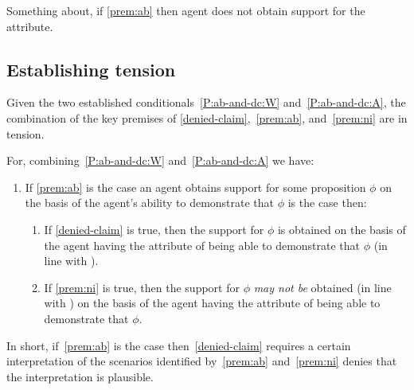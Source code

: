 \begin{note}
  Something about, if \ref{prem:ab} then agent does not obtain support for the attribute.
\end{note}

\subsection{Establishing tension}
\label{sec:establishing-tension}

\begin{note}[Summary]
  Given the two established conditionals~\ref{P:ab-and-dc:W} and~\ref{P:ab-and-dc:A}, the combination of the key premises of \ref{denied-claim},~\ref{prem:ab}, and~\ref{prem:ni} are in tension.

  For, combining~\ref{P:ab-and-dc:W} and~\ref{P:ab-and-dc:A} we have:
  \begin{enumerate}[label=(CC), ref=(CC)]
  \item If \ref{prem:ab} is the case an agent obtains support for some proposition \(\phi\) on the basis of the agent's ability to demonstrate that \(\phi\) is the case then:
    \begin{enumerate}[label=(C\arabic*\(\sim\)), ]
    \item If \ref{denied-claim} is true, then the support for \(\phi\) is obtained on the basis of the agent having the attribute of being able to demonstrate that \(\phi\) (in line with \AR{}).
    \item If \ref{prem:ni} is true, then the support for \(\phi\) \emph{may not be} obtained (in line with \AR{}) on the basis of the agent having the attribute of being able to demonstrate that \(\phi\).
    \end{enumerate}
  \end{enumerate}
  In short, if~\ref{prem:ab} is the case then~\ref{denied-claim} requires a certain interpretation of the scenarios identified by~\ref{prem:ab} and~\ref{prem:ni} denies that the interpretation is plausible.
\end{note}

